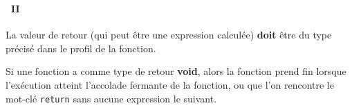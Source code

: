 \begin{frame}[containsverbatim]
  \frametitle{\secname}
  \framesubtitle{\subsecname~II}

  \par
  La valeur de retour (qui peut être une expression calculée) \textbf{doit} être du type précisé dans le profil de la fonction.
  \vspace{0.5cm}
  \par
  Si une fonction a comme type de retour \textbf{void}, alors la fonction prend fin lorsque l'exécution atteint 
  l'accolade fermante de la fonction, ou que l'on rencontre le mot-clé \verb|return| sans aucune expression le suivant.
\end{frame}


